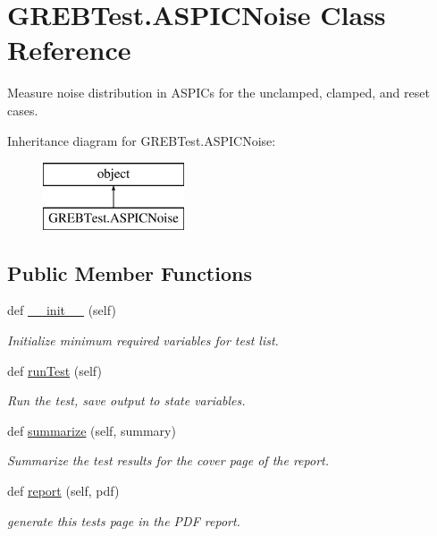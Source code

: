 \hypertarget{class_g_r_e_b_test_1_1_a_s_p_i_c_noise}{}\section{G\+R\+E\+B\+Test.\+A\+S\+P\+I\+C\+Noise Class Reference}
\label{class_g_r_e_b_test_1_1_a_s_p_i_c_noise}


Measure noise distribution in A\+S\+P\+I\+Cs for the unclamped, clamped, and reset cases.  


Inheritance diagram for G\+R\+E\+B\+Test.\+A\+S\+P\+I\+C\+Noise\+:\begin{figure}[H]
\begin{center}
\leavevmode
\includegraphics[height=2.000000cm]{class_g_r_e_b_test_1_1_a_s_p_i_c_noise}
\end{center}
\end{figure}
\subsection*{Public Member Functions}
\begin{DoxyCompactItemize}
\item 
def \hyperlink{class_g_r_e_b_test_1_1_a_s_p_i_c_noise_ac71e749ed1871de1917a340bc1097d0b}{\+\_\+\+\_\+init\+\_\+\+\_\+} (self)
\begin{DoxyCompactList}\small\item\em Initialize minimum required variables for test list. \end{DoxyCompactList}\item 
def \hyperlink{class_g_r_e_b_test_1_1_a_s_p_i_c_noise_aefdfdf594fd5ac62cc477d43a7097d00}{run\+Test} (self)
\begin{DoxyCompactList}\small\item\em Run the test, save output to state variables. \end{DoxyCompactList}\item 
def \hyperlink{class_g_r_e_b_test_1_1_a_s_p_i_c_noise_a670c67244661ddc0126f03bf283846cf}{summarize} (self, summary)
\begin{DoxyCompactList}\small\item\em Summarize the test results for the cover page of the report. \end{DoxyCompactList}\item 
def \hyperlink{class_g_r_e_b_test_1_1_a_s_p_i_c_noise_a890f0ec2e8fa0a8bcc8a314e7f9a1bba}{report} (self, pdf)
\begin{DoxyCompactList}\small\item\em generate this test\textquotesingle{}s page in the P\+DF report. \end{DoxyCompactList}\end{DoxyCompactItemize}


